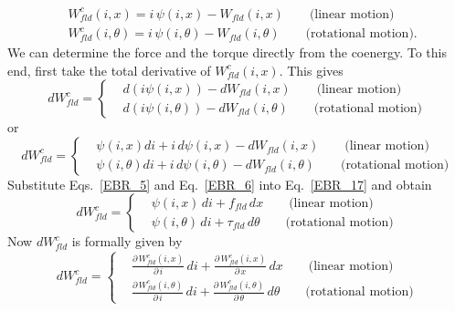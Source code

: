\documentclass[11pt,a4paper,oneside]{book}
\numberwithin{equation}{section}
\theoremstyle{it}
\theoremstyle{definition}
\begin{document}
 \begin{equation}\label{EBR_15}
\boxed{\begin{aligned}
 		&W_{fld}^c(i,x) = i\,\psi(i,x)-W_{fld}(i,x) \qquad \text{(linear motion)} \\[8pt]
 		&W_{fld}^c(i,\theta) = i\,\psi(i,\theta)-W_{fld}(i,\theta) \qquad \text{(rotational motion).} 
 	\end{aligned}}
 \end{equation} 
We can determine the force and the torque directly from the coenergy. To this end, first take the total derivative of $W_{fld}^c(i,x)$. This gives
\begin{equation}\label{EBR_16}
	dW_{fld}^c  = \left\{
	\begin{aligned}
		&d(i\psi(i,x))-dW_{fld}(i,x) \qquad \text{(linear motion)} \\[8pt]
		&d(i\psi(i,\theta))-dW_{fld}(i,\theta) \qquad \text{(rotational motion)} 
	\end{aligned}\right.
\end{equation} 
or 
\begin{equation}\label{EBR_17}
	dW_{fld}^c  = \left\{
	\begin{aligned}
		&\psi(i,x)di + i\,d\psi(i,x) - dW_{fld}(i,x) \qquad \text{(linear motion)} \\[8pt]
		&\psi(i,\theta)di + i\,d\psi(i,\theta) - dW_{fld}(i,\theta) \qquad \text{(rotational motion)} 
	\end{aligned}\right.
\end{equation} 
Substitute Eqs.~\eqref{EBR_5} and Eq.~\eqref{EBR_6} into Eq.~\eqref{EBR_17} and obtain
\begin{equation}\label{EBR_18}
	dW_{fld}^c  = \left\{
	\begin{aligned}
		&\psi(i,x)\,di + f_{fld}\,dx \qquad \text{(linear motion)} \\[8pt]
		&\psi(i,\theta)\,di + \tau_{fld}\,d\theta \qquad \text{(rotational motion)} 
	\end{aligned}\right.
\end{equation} 
Now $dW_{fld}^c$ is formally given by
\begin{equation}\label{EBR_19}
	dW_{fld}^c  = \left\{
	\begin{aligned}
		&\frac{\partial\,W_{fld}^c(i,x)}{\partial\,i}\,di +  \frac{\partial\,W_{fld}^c(i,x)}{\partial\,x}\,dx \qquad \text{(linear motion)} \\[8pt]
		&\frac{\partial\,W_{fld}^c(i,\theta)}{\partial\,i}\,di +  \frac{\partial\,W_{fld}^c(i,\theta)}{\partial\,\theta}\,d\theta \qquad \text{(rotational motion)} 
	\end{aligned}\right.
\end{equation} 
\end{document}
